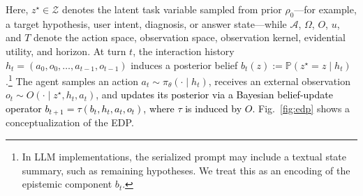 \documentclass[11pt]{article}
\newcommand{\an}[1]{\textcolor{black}{#1}}
\theoremstyle{plain}
\theoremstyle{definition}
\theoremstyle{remark}
\begin{document}
Here, \(z^\star \in \mathcal{Z}\) denotes the latent task variable sampled from prior \(\rho_0\)---for example, a target hypothesis, user intent, diagnosis, or answer state---while \(\mathcal{A}\), \(\Omega\), \(O\), \(u\), and \(T\) denote the action space, observation space, observation kernel, evidential utility, and horizon. At turn \(t\), the interaction history \(h_t=(a_0,o_0,\ldots,a_{t-1},o_{t-1})\) induces a posterior belief \(b_t(z):=\mathbb{P}(z^\star=z \mid h_t)\).\footnote{In LLM implementations, the serialized prompt may include a textual state summary, such as remaining hypotheses. We treat this as an encoding of the epistemic component \(b_t\).} The agent samples an action \(a_t \sim \pi_\theta(\cdot \mid h_t)\), receives an external observation \(o_t \sim O(\cdot \mid z^\star,h_t,a_t)\), and \an{updates its posterior via a Bayesian belief-update operator \(b_{t+1}=\tau(b_t,h_t,a_t,o_t)\), where \(\tau\) is induced by \(O\). }Fig.~\ref{fig:edp} shows a conceptualization of the EDP.

\vspace*{-3mm}
\end{document}
